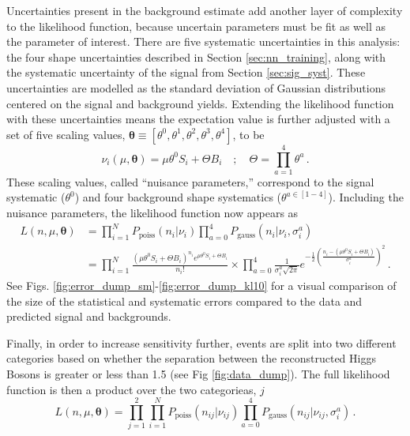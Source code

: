     \newcommand{\btheta}{\boldsymbol{\theta}}
    Uncertainties present in the background estimate add another layer of complexity to the likelihood function,
        because uncertain parameters must be fit as well as the parameter of interest.
    There are five systematic uncertainties in this analysis: 
        the four \mhh shape uncertainties described in Section \ref{sec:nn_training},
        along with the systematic uncertainty of the signal from Section \ref{sec:sig_syst}.
    These uncertainties are modelled as the standard deviation of Gaussian distributions centered on the signal and background yields.
    Extending the likelihood function with these uncertainties means the
        expectation value is further adjusted with a set of five scaling values,
        $\btheta \equiv [\theta^0, \theta^1, \theta^2, \theta^3, \theta^4]$, to be
    \begin{equation}
        \nu_i(\mu, \btheta) = \mu \theta^0 S_i + \Theta B_i \quad;\quad
        \Theta = \prod \limits_{a=1}^{4}  \theta^a
        \,.
    \end{equation}
    These scaling values, called ``nuisance parameters,''
        correspond to the signal systematic ($\theta^0$)
        and four background shape systematics ($\theta^{a\in[1-4]}$).
    Including the nuisance parameters, the likelihood function now appears as
    \begin{equation} \begin{split}
        L(n,\mu,\btheta) &= \prod \limits_{i=1}^{N} P_{\textrm{poiss}}(n_i | \nu_i) 
             \prod \limits_{a=0}^{4} P_{\textrm{gauss}}(n_i | \nu_i, \sigma_i^a) 
        \\&= \prod \limits_{i=1}^{N} \frac{ (\mu \theta^0 S_i + \Theta B_i)^{n_i} e^{\mu \theta^0 S_i + \Theta B_i} }{n_i!} \times
            \prod \limits_{a=0}^4 \frac{1}{\sigma_i^a \sqrt{2\pi}} e^{
                -\frac{1}{2}\left(\frac{n_i- (\mu \theta^0 S_i + \Theta B_i)}{\sigma_i^a}\right)^2
            }
        \,.
    \end{split} \end{equation}
    See Figs. \ref{fig:error_dump_sm}-\ref{fig:error_dump_kl10} for a visual comparison of the size of the statistical and systematic errors
        compared to the data and predicted signal and backgrounds.

    Finally, in order to increase sensitivity further, events are split into two different categories
        based on whether the \deta separation between the reconstructed Higgs Bosons is greater or less than 1.5 (see Fig \ref{fig:data_dump}).
    The full likelihood function is then a product over the two categorieas, $j$
    \begin{equation}
        L(n,\mu,\btheta) = \prod \limits_{j=1}^{2}
             \prod \limits_{i=1}^{N} P_{\textrm{poiss}}(n_{ij} | \nu_{ij}) 
             \prod \limits_{a=0}^{4} P_{\textrm{gauss}}(n_{ij} | \nu_{ij}, \sigma_{i}^a) 
        \,.
    \end{equation}


